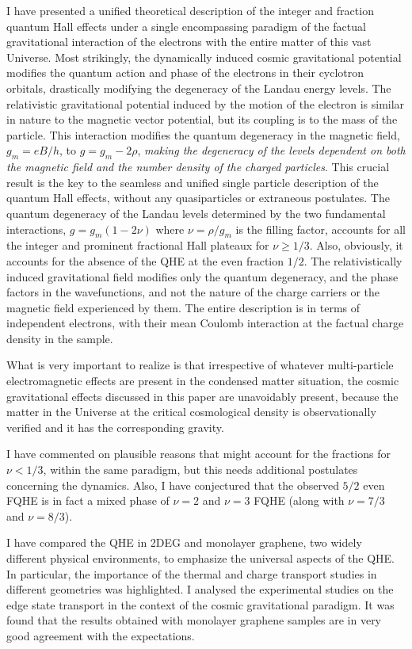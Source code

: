 \documentclass[aps,preprint,12pt,tightenlines]{revtex4}%
\begin{document}
I have presented a unified theoretical description of the integer and fraction
quantum Hall effects under a single encompassing paradigm of the factual
gravitational interaction of the electrons with the entire matter of this vast
Universe. Most strikingly, the dynamically induced cosmic gravitational potential modifies the quantum action and phase of the electrons
in their cyclotron orbitals, drastically modifying the degeneracy of the
Landau energy levels. The relativistic gravitational potential induced by the
motion of the electron is similar in nature to the magnetic vector
potential, but its coupling is to the mass of the particle. This interaction
modifies the quantum degeneracy in the magnetic field, $g_{m}=eB/h$,
to $g=g_{m}-2\rho$, \emph{making the degeneracy of the
levels dependent on both the magnetic field and the number density of the
charged particles}. This crucial result 
is the key to the seamless and unified single particle description of the
quantum Hall effects, without any quasiparticles or extraneous postulates. The
quantum degeneracy of the Landau levels determined by the two fundamental
interactions, $g=g_{m}(1-2\nu)$ where $\nu=\rho/g_{m}$ is the filling factor,
accounts for all the integer and prominent fractional Hall plateaux for
$\nu\geq1/3$. Also, obviously, it accounts for the absence of the QHE at the
even fraction $1/2$. The relativistically induced
gravitational field modifies only the quantum degeneracy, and the phase
factors in the wavefunctions, and not the nature of the charge carriers or the magnetic field experienced by them. The entire description is in terms of independent electrons, with
their mean Coulomb interaction at the factual charge density in the sample.

What is very important to realize is that irrespective of whatever
multi-particle electromagnetic effects are present in the condensed matter
situation, the cosmic gravitational effects discussed in this paper are
unavoidably present, because the matter in the Universe at the critical
cosmological density is observationally verified and it has the corresponding
gravity. 

I have commented on plausible reasons that might account for the
fractions for $\nu<1/3$, within the same paradigm, but this needs 
additional postulates concerning the dynamics. Also, I have conjectured that the observed $5/2$ even FQHE is in fact
a mixed phase of $\nu=2$ and $\nu=3$ FQHE (along with $\nu=7/3$ and $\nu=8/3$).

I have compared the QHE in 2DEG and monolayer graphene, two widely different physical environments, to emphasize the universal aspects of the QHE. In particular, the importance of the thermal and charge transport studies in different geometries was highlighted. I analysed the experimental studies on the edge state transport in the context of the cosmic gravitational paradigm. It was found that the results obtained with monolayer graphene samples are in very good agreement with the expectations. 
\end{document}
